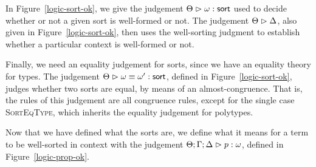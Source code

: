 In Figure~\ref{logic-sort-ok}, we give the judgement
${{\Theta}} \vartriangleright {{\omega}} : {\mathsf{sort}}$ used to decide whether or not a given sort is
well-formed or not. The judgement ${\Theta} \vartriangleright {\Delta}$, also given in
Figure~\ref{logic-sort-ok}, then uses the well-sorting judgment to
establish whether a particular context is well-formed or not. 

Finally, we need an equality judgement for sorts, since we have an
equality theory for types. The judgement
${\Theta} \vartriangleright {\omega} \equiv {\omega'} : \mathsf{sort}$, defined in
Figure~\ref{logic-sort-ok}, judges whether two sorts are equal, by
means of an almost-congruence. That is, the rules of this judgement
are all congruence rules, except for the single case
\textsc{SortEqType}, which inherits the equality judgement for
polytypes.

Now that we have defined what the sorts are, we define what it means
for a term to be well-sorted in context with the judgement
${\Theta; \Gamma; \Delta} \vartriangleright {p} : {\omega}$, defined in Figure~\ref{logic-prop-ok}.

